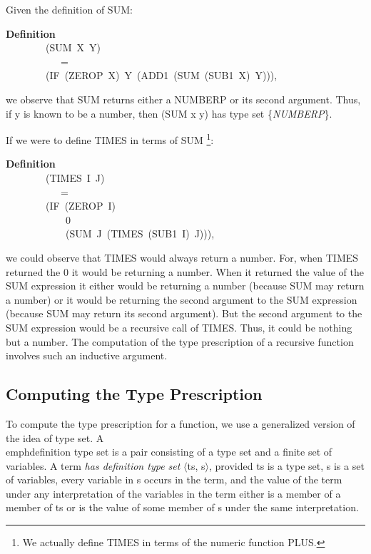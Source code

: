 \documentclass[10pt]{book}
\newenvironment{pubasis}{\begin{flushleft}}{\end{flushleft}}
\newcommand{\axiomordefinition}[1]{\vspace{6pt}\Large\textsf{\textbf{#1}}\normalsize}
\begin{document}
Given the definition of SUM:
\begin{pubasis}
\axiomordefinition{Definition}\\
~~~~~~~~(SUM~X~Y)\\
~~~~~~~~~~~=\\
~~~~~~~~(IF~(ZEROP~X)~Y~(ADD1~(SUM~(SUB1~X)~Y))),\\
\end{pubasis}
we observe that SUM returns either a NUMBERP or its second
argument.  Thus, if y is known to be a number, then 
(SUM x y) has type set \{\emph{NUMBERP}\}.

If we were to define TIMES in terms of SUM \footnote{We actually define TIMES in terms of the numeric function PLUS.}:
\begin{pubasis}
\axiomordefinition{Definition}\\
~~~~~~~~(TIMES~I~J)\\
~~~~~~~~~~~=\\
~~~~~~~~(IF~(ZEROP~I)\\
~~~~~~~~~~~~0\\
~~~~~~~~~~~~(SUM~J~(TIMES~(SUB1~I)~J))),\\
\end{pubasis}
we could observe that TIMES would always return a number.
For, when TIMES returned the 0 it would be returning
a number.  When it returned the value of the SUM expression it either
would be returning a number (because SUM may return a number) or it
would be returning
the second argument to the SUM expression (because SUM  may
return its second argument).  But the second argument to the SUM
expression would be a recursive call of TIMES.  Thus, it could be nothing but
a number.  The computation of the type prescription of a recursive function
involves such an inductive argument.

\subsection{Computing the Type Prescription}
To compute the type prescription for a function, we use
a generalized version of the idea of type set.  A \\emph{definition
type set} is a pair consisting of a type set and a
finite set of variables.   A term
\emph{has  definition type set} $\langle$ts, s$\rangle$, provided ts is a
type set, s is a set of variables, every variable in s
occurs in the term, and  the value of the term
under any interpretation of the variables in the term either
is a member of a member of ts or is the value of some
member of s under the same interpretation.
\end{document}
